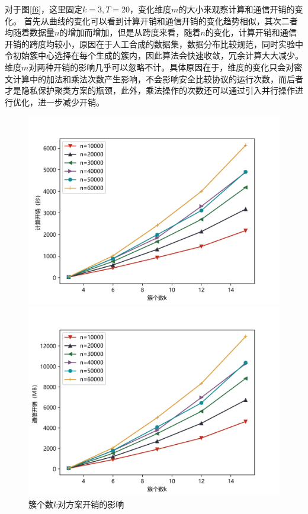 对于图\ref{f6}，这里固定$k=3, T=20$，变化维度$ m $的大小来观察计算和通信开销的变化。
首先从曲线的变化可以看到计算开销和通信开销的变化趋势相似，其次二者均随着数据量$ n $的增加而增加，但是从跨度来看，随着$ n $的变化，计算开销和通信开销的跨度均较小，原因在于人工合成的数据集，数据分布比较规范，同时实验中令初始簇中心选择在每个生成的簇内，因此算法会快速收敛，冗余计算大大减少。
维度$ m $对两种开销的影响几乎可以忽略不计。具体原因在于，维度的变化只会对密文计算中的加法和乘法次数产生影响，不会影响安全比较协议的运行次数，而后者才是隐私保护聚类方案的瓶颈，此外，乘法操作的次数还可以通过引入并行操作进行优化，进一步减少开销。

\begin{figure}[htbp]
	\begin{minipage}[t]{0.5\linewidth}
		\includegraphics[width=\linewidth]{img/newk_time.png}
		
	\end{minipage}%
	\hfill%
	\begin{minipage}[t]{0.5\linewidth}
		\includegraphics[width=\linewidth]{img/newk_comm.png}
		
	\end{minipage}
	\caption{簇个数$ k $对方案开销的影响}
	\label{f7}
\end{figure}

